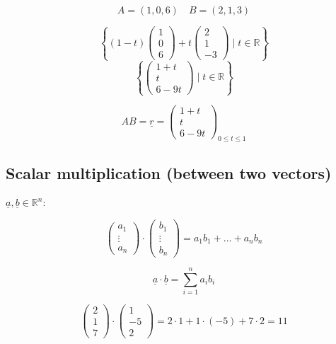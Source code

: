 \documentclass[00_complete]{subfiles}
\begin{document}
\begin{example}
$$A=(1,0,6) \quad B=(2,1,3)$$


$$
    \left\{(1-t)\begin{pmatrix}
        1\\0\\6
    \end{pmatrix}+t \begin{pmatrix}
        2\\1\\-3
    \end{pmatrix}\;|\; t \in \mathbb{R}\right\}
$$
$$
    \left\{\begin{pmatrix}
        1+t\\t\\6-9t
    \end{pmatrix} \;|\; t \in \mathbb{R} \right\}
$$

$$
    AB=\underline r = \begin{pmatrix}
        1+t\\t\\6-9t
    \end{pmatrix}_{0 \leq t \leq 1}
$$
\end{example}
\subsection{Scalar multiplication (between two vectors)}

$\underline a, \underline b \in \mathbb{R}^n$:

$$\begin{pmatrix}
    a_1 \\ \vdots \\ a_n
\end{pmatrix} \cdot \begin{pmatrix}
    b_1 \\ \vdots \\ b_n
\end{pmatrix} = a_1 b_1 + \dots + a_n b_n$$

$$\underline a \cdot \underline b = \sum_{i=1}^n a_i b_i$$

\begin{example}
$$\begin{pmatrix}
    2\\1\\7
\end{pmatrix} \cdot \begin{pmatrix}
    1\\-5\\2
\end{pmatrix} = 2 \cdot 1 + 1 \cdot (-5) + 7 \cdot 2 = 11$$
\end{example}
\end{document}
